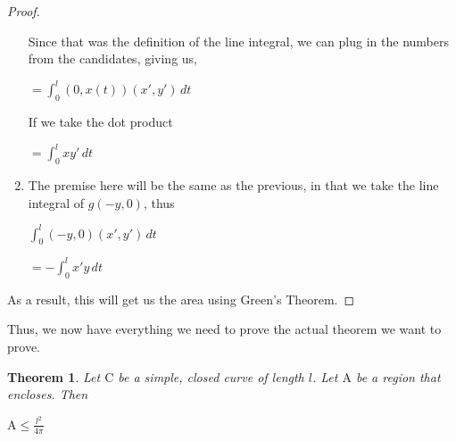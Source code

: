 \documentclass[a4paper]{book}
\newtheorem{theorem}{Theorem}%
\numberwithin{theorem}{section}%
\begin{document}
\begin{proof}
\begin{enumerate}
            Since that was the definition of the line integral, we can plug in the numbers from the candidates, giving us,
            \begin{center}
                $\displaystyle = \int_{0}^{l} (0,x(t))(x',y') \,dt$
            \end{center}

            If we take the dot product
			\begin{center}
                $\displaystyle = \int_{0}^{l} xy' \,dt$
            \end{center}
			
		\item
            The premise here will be the same as the previous, in that we take the line integral of $g(-y,0)$, thus
            \begin{center}
                $\displaystyle \int_{0}^{l} (-y,0)(x',y') \,dt$

                $\displaystyle =-\int_{0}^{l} x'y \,dt$
            \end{center}
	\end{enumerate}
    As a result, this will get us the area using Green's Theorem. 
\end{proof}
Thus, we now have everything we need to prove the actual theorem we want to prove.
\begin{theorem}
    Let $\mathrm{C}$ be a simple, closed curve of length $l$. Let $\mathrm{A}$ be a region that encloses. Then
    \begin{center}
        $\displaystyle \mathrm{A}\leq\frac{l^2}{4\pi}$
    \end{center}
\end{theorem}
\end{document}
